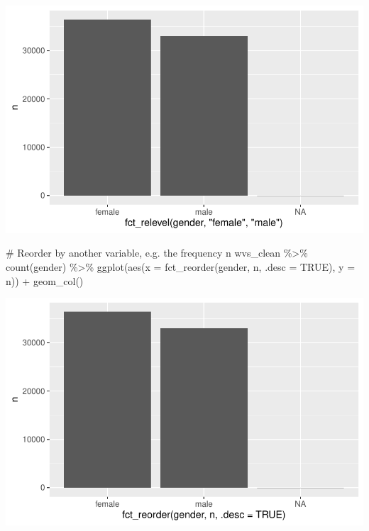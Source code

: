 \documentclass[
  letterpaper,
]{krantz}
\makeatletter
\newenvironment{Shaded}{\begin{snugshade}}{\end{snugshade}}
\newcommand{\AttributeTok}[1]{\textcolor[rgb]{0.40,0.45,0.13}{#1}}
\newcommand{\CommentTok}[1]{\textcolor[rgb]{0.37,0.37,0.37}{#1}}
\newcommand{\ConstantTok}[1]{\textcolor[rgb]{0.56,0.35,0.01}{#1}}
\newcommand{\FunctionTok}[1]{\textcolor[rgb]{0.28,0.35,0.67}{#1}}
\newcommand{\NormalTok}[1]{\textcolor[rgb]{0.00,0.23,0.31}{#1}}
\newcommand{\SpecialCharTok}[1]{\textcolor[rgb]{0.37,0.37,0.37}{#1}}
\newenvironment{kframe}{%
\medskip{}
\setlength{\fboxsep}{.8em}
 \def\at@end@of@kframe{}%
 \ifinner\ifhmode%
  \def\at@end@of@kframe{\end{minipage}}%
  \begin{minipage}{\columnwidth}%
 \fi\fi%
 \def\FrameCommand##1{\hskip\@totalleftmargin \hskip-\fboxsep
 \colorbox{shadecolor}{##1}\hskip-\fboxsep
     \hskip-\linewidth \hskip-\@totalleftmargin \hskip\columnwidth}%
 \MakeFramed {\advance\hsize-\width
   \@totalleftmargin\z@ \linewidth\hsize
   \@setminipage}}%
 {\par\unskip\endMakeFramed%
 \at@end@of@kframe}
\renewenvironment{Shaded}{\begin{kframe}}{\end{kframe}}
\makeatother
\begin{document}
\includegraphics{07_data_wrangling_files/figure-pdf/reorder-factor-levels-forcats-1.pdf}

\begin{Shaded}
\begin{Highlighting}[]
\CommentTok{\# Reorder by another variable, e.g. the frequency \textquotesingle{}n\textquotesingle{}}
\NormalTok{wvs\_clean }\SpecialCharTok{\%\textgreater{}\%}
  \FunctionTok{count}\NormalTok{(gender) }\SpecialCharTok{\%\textgreater{}\%}
  \FunctionTok{ggplot}\NormalTok{(}\FunctionTok{aes}\NormalTok{(}\AttributeTok{x =} \FunctionTok{fct\_reorder}\NormalTok{(gender, n, }\AttributeTok{.desc =} \ConstantTok{TRUE}\NormalTok{),}
             \AttributeTok{y =}\NormalTok{ n)) }\SpecialCharTok{+}
  \FunctionTok{geom\_col}\NormalTok{()}
\end{Highlighting}
\end{Shaded}

\includegraphics{07_data_wrangling_files/figure-pdf/reorder-by-other-variable-1.pdf}
\end{document}
